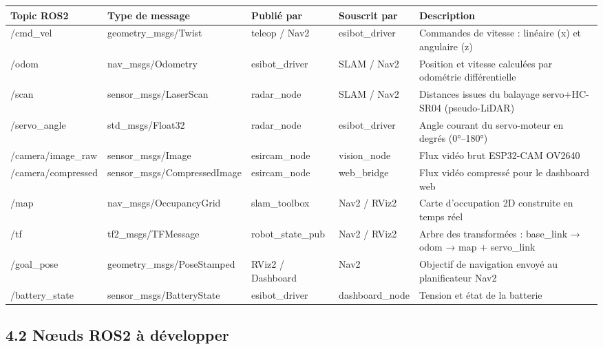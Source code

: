 \documentclass[12pt,a4paper]{article}
\begin{document}
\begin{longtable}{>{\ttfamily}p{3cm} p{3.8cm} p{2cm} p{2cm} p{3.5cm}}
\toprule
\textbf{Topic ROS2} & \textbf{Type de message} & \textbf{Publié par} & \textbf{Souscrit par} & \textbf{Description} \\
\midrule
\endhead
/cmd\_vel & geometry\_msgs/Twist & teleop / Nav2 & esibot\_driver & Commandes de vitesse : linéaire (x) et angulaire (z) \\[4pt]
/odom & nav\_msgs/Odometry & esibot\_driver & SLAM / Nav2 & Position et vitesse calculées par odométrie différentielle \\[4pt]
/scan & sensor\_msgs/LaserScan & radar\_node & SLAM / Nav2 & Distances issues du balayage servo+HC-SR04 (pseudo-LiDAR) \\[4pt]
/servo\_angle & std\_msgs/Float32 & radar\_node & esibot\_driver & Angle courant du servo-moteur en degrés (0°–180°) \\[4pt]
/camera/image\_raw & sensor\_msgs/Image & esircam\_node & vision\_node & Flux vidéo brut ESP32-CAM OV2640 \\[4pt]
/camera/compressed & sensor\_msgs/CompressedImage & esircam\_node & web\_bridge & Flux vidéo compressé pour le dashboard web \\[4pt]
/map & nav\_msgs/OccupancyGrid & slam\_toolbox & Nav2 / RViz2 & Carte d'occupation 2D construite en temps réel \\[4pt]
/tf & tf2\_msgs/TFMessage & robot\_state\_pub & Nav2 / RViz2 & Arbre des transformées : base\_link → odom → map + servo\_link \\[4pt]
/goal\_pose & geometry\_msgs/PoseStamped & RViz2 / Dashboard & Nav2 & Objectif de navigation envoyé au planificateur Nav2 \\[4pt]
/battery\_state & sensor\_msgs/BatteryState & esibot\_driver & dashboard\_node & Tension et état de la batterie \\
\bottomrule
\end{longtable}

\subsection{4.2 Nœuds ROS2 à développer}
\end{document}
